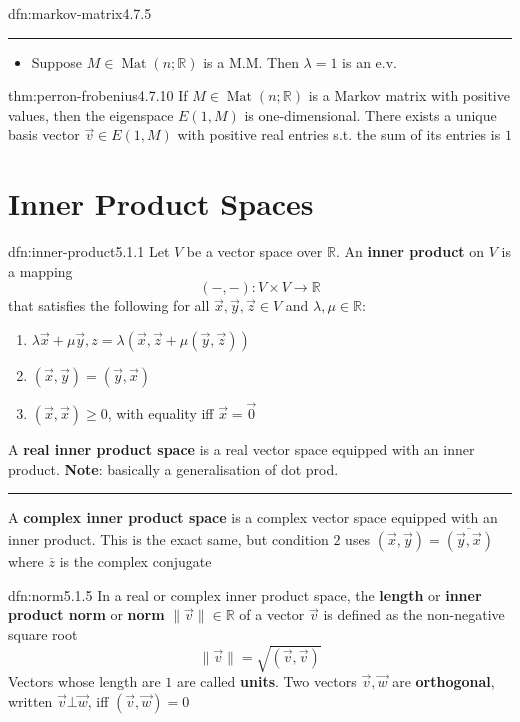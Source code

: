 \documentclass[landscape, 8pt]{extarticle}
\DeclareMathOperator{\Mat}{Mat}
\begin{document}
\begin{multicols}{3}
\begin{dfn}{dfn:markov-matrix}{4.7.5}
    \noindent\rule{\textwidth}{0.2pt}
    \begin{itemize}
        \setlength\itemsep{0em}
        \item[\textbf{4.7.6:}] Suppose $M\in \Mat(n;\mathbb{R})$ is a M.M. Then $\lambda = 1$ is an e.v.
    \end{itemize}
\end{dfn}

\begin{thm}{thm:perron-frobenius}{4.7.10}
    If $M\in \Mat(n;\mathbb{R})$ is a Markov matrix with positive values, then the eigenspace $E(1, M)$ is one-dimensional. There exists a unique basis vector $\vec{v}\in E(1,M)$ with positive real entries s.t. the sum of its entries is $1$
\end{thm}

\section{Inner Product Spaces}

\begin{dfn}{dfn:inner-product}{5.1.1}
    Let $V$ be a vector space over $\mathbb{R}$. An \textbf{inner product} on $V$ is a mapping
    \[(- , - ) : V \times V \to \mathbb{R}\]
    that satisfies the following for all $\vec{x}, \vec{y}, \vec{z}\in V$ and $\lambda,\mu\in \mathbb{R}$:
    \begin{enumerate}
        \setlength\itemsep{0em}
        \item $\lambda\vec{x}+\mu\vec{y},z = \lambda(\vec{x},\vec{z} + \mu(\vec{y},\vec{z}))$
        \item $(\vec{x},\vec{y}) = (\vec{y}, \vec{x})$
        \item $(\vec{x},\vec{x}) \ge 0$, with equality iff $\vec{x} = \vec{0}$
    \end{enumerate}
    A \textbf{real inner product space} is a real vector space equipped with an inner product. \textbf{Note}: basically a generalisation of dot prod.

    \noindent\rule{\textwidth}{0.2pt}
    A \textbf{complex inner product space} is a complex vector space equipped with an inner product. This is the exact same, but condition $2$ uses $(\vec{x},\vec{y}) = \overline{(\vec{y}, \vec{x})}$ where $\overline{z}$ is the complex conjugate
\end{dfn}

\begin{dfn}[Norm]{dfn:norm}{5.1.5}
    In a real or complex inner product space, the \textbf{length} or \textbf{inner product norm} or \textbf{norm} $\lVert \vec{v} \rVert\in \mathbb{R}$ of a vector $\vec{v}$ is defined as the non-negative square root
    \[\lVert \vec{v} \rVert = \sqrt{(\vec{v}, \vec{v})}\]
    Vectors whose length are $1$ are called \textbf{units}. Two vectors $\vec{v}, \vec{w}$ are \textbf{orthogonal}, written $\vec{v} \bot \vec{w}$, iff $(\vec{v}, \vec{w}) = 0$


\end{dfn}
\end{multicols}
\end{document}

